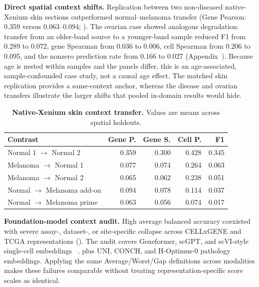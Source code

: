 \documentclass[sigconf,review]{acmart}
\begin{document}
\noindent\textbf{Direct spatial context shifts.}
Replication between two non-diseased native-Xenium skin sections outperformed
normal--melanoma transfer (Gene Pearson: 0.359 versus 0.063--0.094;
). The ovarian case showed analogous degradation:
transfer from an older-band source to a younger-band sample reduced F1 from
0.289 to 0.072, gene Spearman from 0.036 to 0.006, cell Spearman from 0.206 to
0.095, and the nonzero prediction rate from 0.166 to 0.027
(Appendix~). Because age is nested within samples
and the panels differ, this is an age-associated, sample-confounded case study,
not a causal age effect.
The matched skin replication provides a same-context anchor, whereas the
disease and ovarian transfers illustrate the larger shifts that pooled
in-domain results would hide.

\begin{table}[t]
\centering
\footnotesize
\setlength{\tabcolsep}{1.4pt}
\caption{\textbf{Native-Xenium skin context transfer.} Values are means across
spatial holdouts.}
\label{tab:main_skin_context}
\begin{tabular}{lrrrr}
\toprule
Contrast & Gene P. & Gene S. & Cell P. & F1 \\
\midrule
Normal 1 \(\rightarrow\) Normal 2 & 0.359 & 0.300 & 0.428 & 0.345 \\
Melanoma \(\rightarrow\) Normal 1 & 0.077 & 0.074 & 0.264 & 0.063 \\
Melanoma \(\rightarrow\) Normal 2 & 0.065 & 0.062 & 0.238 & 0.051 \\
Normal \(\rightarrow\) Melanoma add-on & 0.094 & 0.078 & 0.114 & 0.037 \\
Normal \(\rightarrow\) Melanoma prime & 0.063 & 0.056 & 0.074 & 0.017 \\
\bottomrule
\end{tabular}
\end{table}

\noindent\textbf{Foundation-model context audit.}
High average balanced accuracy coexisted with severe assay-, dataset-, or
site-specific collapse across CELLxGENE and TCGA representations
(). The audit covers Geneformer, scGPT, and
scVI-style single-cell embeddings
~\cite{theodoris2023geneformer,cui2024scgpt,lopez2018scvi,cellxgene2025}, plus
UNI, CONCH, and H-Optimus-0 pathology embeddings.
Applying the same Average/Worst/Gap definitions across modalities makes these
failures comparable without treating representation-specific score scales as
identical.
\end{document}
